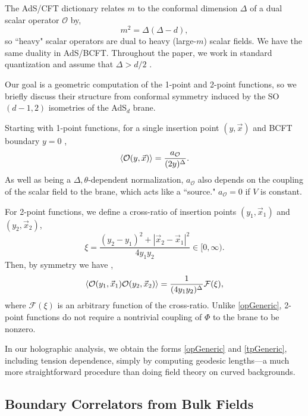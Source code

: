 \documentclass[reprint,amsmath,amssymb,aps,nofootinbib,twocolumn]{revtex4-2}
\begin{document}
The AdS/CFT dictionary \cite{Freedman:1999gp,Aharony:1999ti} relates $m$ to the conformal dimension $\Delta$ of a dual scalar operator $\mathcal{O}$ by,
\begin{equation}
m^2 = \Delta(\Delta - d),\label{massCD}
\end{equation}
so ``heavy" scalar operators are dual to heavy (large-$m$) scalar fields. We have the same duality in AdS/BCFT. Throughout the paper, we work in standard quantization and assume that $ \Delta > d\slash 2 $ \cite{Klebanov:1999tb}.

Our goal is a geometric computation of the 1-point and 2-point functions, so we briefly discuss their structure from conformal symmetry induced by the SO$(d-1,2)$ isometries of the AdS$_d$ brane.

Starting with 1-point functions, for a single insertion point $(y,\vec{x})$ and BCFT boundary $y = 0$ \cite{Cardy:1984bb,DeWolfe:2001pq},
\begin{equation}
\expval{\mathcal{O}(y,\vec{x})} = \frac{a_\mathcal{O}}{(2y)^\Delta}.\label{opGeneric}
\end{equation}
As well as being a $\Delta,\theta$-dependent normalization, $a_\mathcal{O}$ also depends on the coupling of the scalar field to the brane, which acts like a ``source." $a_\mathcal{O} = 0$ if $V$ is constant.

For 2-point functions, we define a cross-ratio of insertion points $(y_1,\vec{x}_1)$ and $(y_2,\vec{x}_2)$,
\begin{equation}
\xi = \frac{(y_2 - y_1)^2 + |\vec{x}_2 - \vec{x}_1|^2}{4y_1 y_2} \in [0,\infty).\label{crossRatio}
\end{equation}
Then, by symmetry we have \cite{Liendo:2012hy,Mazac:2018biw},
\begin{equation}
\expval{\mathcal{O}(y_1,\vec{x}_1)\mathcal{O}(y_2,\vec{x}_2)} = \frac{1}{(4y_1 y_2)^\Delta} \mathcal{F}(\xi),\label{tpGeneric}
\end{equation}
where $ \mathcal{F}(\xi) $ is an arbitrary function of the cross-ratio. Unlike \eqref{opGeneric}, 2-point functions do not require a nontrivial coupling of $\Phi$ to the brane to be nonzero.

In our holographic analysis, we obtain the forms \eqref{opGeneric} and \eqref{tpGeneric}, including tension dependence, simply by computing geodesic lengths---a much more straightforward procedure than doing field theory on curved backgrounds.

\subsection{Boundary Correlators from Bulk Fields}\label{secIIb}
\end{document}
